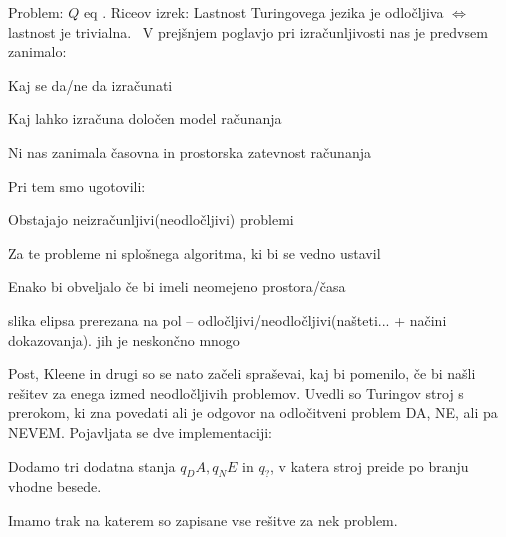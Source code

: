 \documentclass[10pt,a4paper,oneside]{book}
\begin{document}
\begin{neurejeno}
Problem: $Q$ eq .
Riceov izrek: Lastnost Turingovega jezika je odločljiva $\Longleftrightarrow$ lastnost je trivialna.\
\sect{Povzetek}
V prejšnjem poglavjo pri izračunljivosti nas je predvsem zanimalo:
\begin{items}
\item Kaj se da/ne da izračunati
\item Kaj lahko izračuna določen model računanja
\item Ni nas zanimala časovna in prostorska zatevnost računanja
\end{items}

Pri tem smo ugotovili:
\begin{items}
\item Obstajajo neizračunljivi(neodločljivi) problemi
\item Za te probleme ni splošnega algoritma, ki bi se vedno ustavil
\item Enako bi obveljalo če bi imeli neomejeno prostora/časa 
\end{items}

\fixme slika elipsa prerezana na pol -- odločljivi/neodločljivi(našteti... + načini dokazovanja). jih je neskončno mnogo

Post, Kleene in drugi so se nato začeli spraševai, kaj bi pomenilo, če bi našli rešitev za enega izmed neodločljivih problemov.
Uvedli so Turingov stroj s prerokom, ki zna povedati ali je odgovor na odločitveni problem DA, NE, ali pa NEVEM.
Pojavljata se dve implementaciji:
\begin{items}
\item Dodamo tri dodatna stanja $q_DA, q_NE$ in $q_?$, v katera stroj preide po branju vhodne besede.
\item Imamo trak na katerem so zapisane vse rešitve za nek problem.
\end{items}


\end{neurejeno}
\end{document}
